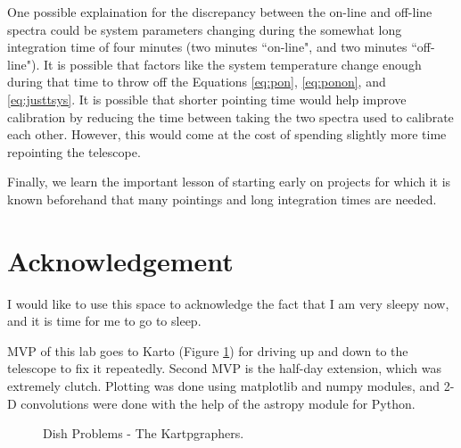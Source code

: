 \documentclass[12pt]{article}
\begin{document}
One possible explaination for the discrepancy between the on-line and off-line spectra could be system parameters changing during the somewhat long integration time of four minutes (two minutes ``on-line", and two minutes ``off-line"). It is possible that factors like the system temperature change enough during that time to throw off the Equations \ref{eq:pon}, \ref{eq:ponon}, and \ref{eq:justtsys}. It is possible that shorter pointing time would help improve calibration by reducing the time between taking the two spectra used to calibrate each other. However, this would come at the cost of spending slightly more time repointing the telescope.

Finally, we learn the important lesson of starting early on projects for which it is known beforehand that many pointings and long integration times are needed.

\section{Acknowledgement}
I would like to use this space to acknowledge the fact that I am very sleepy now, and it is time for me to go to sleep.

MVP of this lab goes to Karto (Figure \ref{fig:kartp}) for driving up and down to the telescope to fix it repeatedly. Second MVP is the half-day extension, which was extremely clutch. Plotting was done using matplotlib and numpy modules, and 2-D convolutions were done with the help of the astropy module for Python.





\newpage
\begin{figure}[H]
\caption[SODUMB]{Dish Problems - The Kartpgraphers.}
\label{fig:kartp}
\end{figure}
\end{document}
